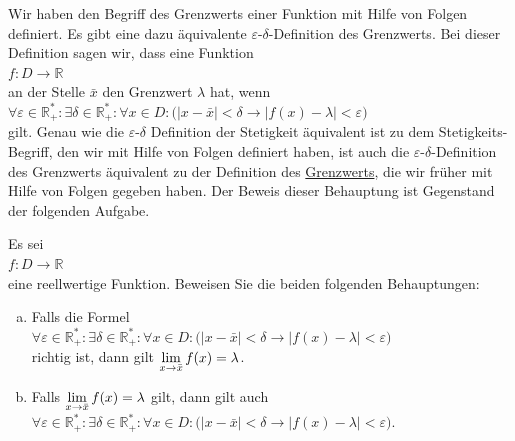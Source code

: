 \remark
Wir haben den Begriff des Grenzwerts einer Funktion mit Hilfe von Folgen definiert.  Es gibt eine
dazu \"aquivalente $\varepsilon$-$\delta$-Definition des Grenzwerts.  Bei dieser Definition sagen wir,
dass eine Funktion
\\[0.2cm]
\hspace*{1.3cm}
$f: D \rightarrow \mathbb{R}$
\\[0.2cm]
an der Stelle $\bar{x}$ den Grenzwert $\lambda$ hat, wenn
\\[0.2cm]
\hspace*{1.3cm}
$\forall \varepsilon\in\mathbb{R}_+^*: \exists\delta\in\mathbb{R}_+^*: \forall x\in D:\bigl(|x-\bar{x}|<\delta \rightarrow |f(x) - \lambda| < \varepsilon\bigr)$
\\[0.2cm]
gilt.  Genau wie die $\varepsilon$-$\delta$ Definition der Stetigkeit \"aquivalent ist zu dem
Stetigkeits-Begriff, den wir mit Hilfe von Folgen definiert haben, ist auch die
$\varepsilon$-$\delta$-Definition des Grenzwerts \"aquivalent zu der Definition des
\href{http://de.wikipedia.org/wiki/Grenzwert_(Funktion)}{Grenzwerts}, die wir 
fr\"uher mit Hilfe von Folgen gegeben haben.  Der Beweis dieser Behauptung ist Gegenstand der 
folgenden Aufgabe.
\pagebreak

\exercise
Es sei \\[0.2cm]
\hspace*{1.3cm}
$f: D \rightarrow \mathbb{R}$
\\[0.2cm]
eine reellwertige Funktion.  Beweisen Sie die beiden folgenden Behauptungen:
\begin{enumerate}[(a)]
\item Falls die Formel
      \\[0.2cm]
      \hspace*{1.3cm}
      $\forall \varepsilon\in\mathbb{R}_+^*: \exists\delta\in\mathbb{R}_+^*: \forall x\in D:\bigl(|x-\bar{x}|<\delta \rightarrow |f(x) - \lambda| < \varepsilon\bigr)$
      \\[0.2cm]
      richtig ist, dann gilt
      $\displaystyle \lim\limits_{x\rightarrow\bar{x}} f(x) = \lambda$.
\item Falls  $\displaystyle \lim\limits_{x\rightarrow\bar{x}} f(x) = \lambda$ gilt, dann gilt auch
      \\[0.2cm]
      \hspace*{1.3cm}
      $\forall \varepsilon\in\mathbb{R}_+^*: \exists\delta\in\mathbb{R}_+^*: \forall x\in D:\bigl(|x-\bar{x}|<\delta \rightarrow |f(x) - \lambda| < \varepsilon\bigr)$.
      \eox
\end{enumerate}



